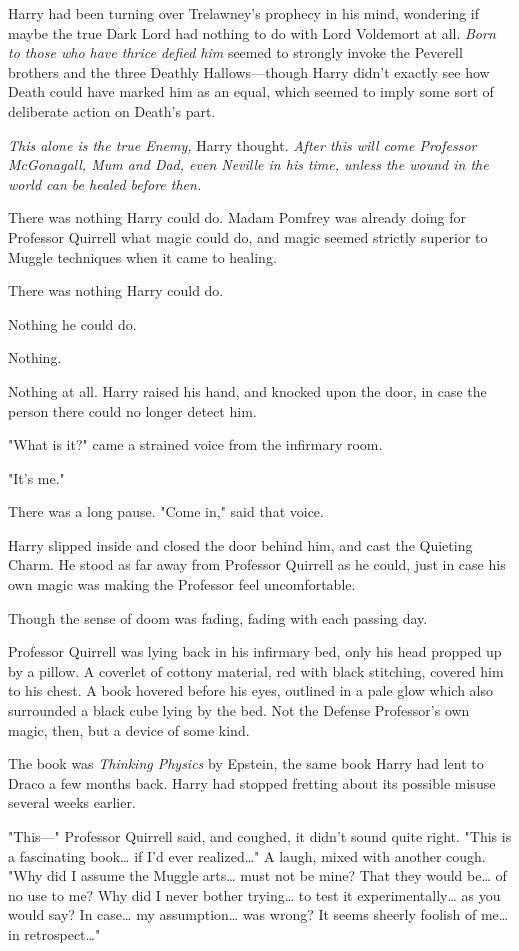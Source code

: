 Harry had been turning over Trelawney's prophecy in his mind, wondering if
maybe the true Dark Lord had nothing to do with Lord Voldemort at all.
\emph{Born to those who have thrice defied him} seemed to strongly invoke the
Peverell brothers and the three Deathly Hallows---though Harry didn't exactly
see how Death could have marked him as an equal, which seemed to imply some
sort of deliberate action on Death's part.

\emph{This alone is the true Enemy,} Harry thought. \emph{After this will come
Professor McGonagall, Mum and Dad, even Neville in his time, unless the wound
in the world can be healed before then.}

There was nothing Harry could do. Madam Pomfrey was already doing for Professor
Quirrell what magic could do, and magic seemed strictly superior to Muggle
techniques when it came to healing.

There was nothing Harry could do.

Nothing he could do.

Nothing.

Nothing at all.
\sbreak
Harry raised his hand, and knocked upon the door, in case the person there
could no longer detect him.

"What is it?" came a strained voice from the infirmary room.

"It's me."

There was a long pause. "Come in," said that voice.

Harry slipped inside and closed the door behind him, and cast the Quieting
Charm. He stood as far away from Professor Quirrell as he could, just in case
his own magic was making the Professor feel uncomfortable.

Though the sense of doom was fading, fading with each passing day.

Professor Quirrell was lying back in his infirmary bed, only his head propped
up by a pillow. A coverlet of cottony material, red with black stitching,
covered him to his chest. A book hovered before his eyes, outlined in a pale
glow which also surrounded a black cube lying by the bed. Not the Defense
Professor's own magic, then, but a device of some kind.

The book was \emph{Thinking Physics} by Epstein, the same book Harry had lent
to Draco a few months back. Harry had stopped fretting about its possible
misuse several weeks earlier.

"This---" Professor Quirrell said, and coughed, it didn't sound quite right.
"This is a fascinating book{\ldots} if I'd ever realized{\ldots}" A laugh,
mixed with another cough. "Why did I assume the Muggle arts{\ldots} must not be
mine? That they would be{\ldots} of no use to me? Why did I never bother
trying{\ldots} to test it experimentally{\ldots} as you would say? In
case{\ldots} my assumption{\ldots} was wrong? It seems sheerly foolish of
me{\ldots} in retrospect{\ldots}"

